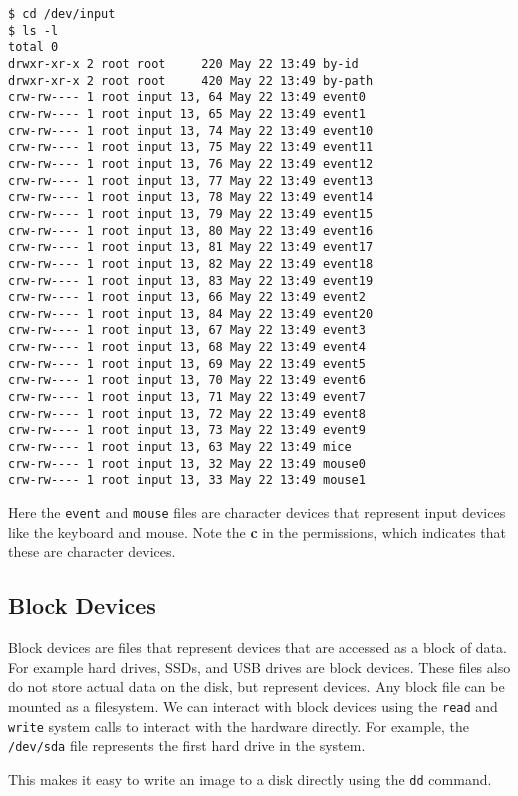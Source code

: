 \begin{lstlisting}
$ cd /dev/input
$ ls -l
total 0
drwxr-xr-x 2 root root     220 May 22 13:49 by-id
drwxr-xr-x 2 root root     420 May 22 13:49 by-path
crw-rw---- 1 root input 13, 64 May 22 13:49 event0
crw-rw---- 1 root input 13, 65 May 22 13:49 event1
crw-rw---- 1 root input 13, 74 May 22 13:49 event10
crw-rw---- 1 root input 13, 75 May 22 13:49 event11
crw-rw---- 1 root input 13, 76 May 22 13:49 event12
crw-rw---- 1 root input 13, 77 May 22 13:49 event13
crw-rw---- 1 root input 13, 78 May 22 13:49 event14
crw-rw---- 1 root input 13, 79 May 22 13:49 event15
crw-rw---- 1 root input 13, 80 May 22 13:49 event16
crw-rw---- 1 root input 13, 81 May 22 13:49 event17
crw-rw---- 1 root input 13, 82 May 22 13:49 event18
crw-rw---- 1 root input 13, 83 May 22 13:49 event19
crw-rw---- 1 root input 13, 66 May 22 13:49 event2
crw-rw---- 1 root input 13, 84 May 22 13:49 event20
crw-rw---- 1 root input 13, 67 May 22 13:49 event3
crw-rw---- 1 root input 13, 68 May 22 13:49 event4
crw-rw---- 1 root input 13, 69 May 22 13:49 event5
crw-rw---- 1 root input 13, 70 May 22 13:49 event6
crw-rw---- 1 root input 13, 71 May 22 13:49 event7
crw-rw---- 1 root input 13, 72 May 22 13:49 event8
crw-rw---- 1 root input 13, 73 May 22 13:49 event9
crw-rw---- 1 root input 13, 63 May 22 13:49 mice
crw-rw---- 1 root input 13, 32 May 22 13:49 mouse0
crw-rw---- 1 root input 13, 33 May 22 13:49 mouse1
\end{lstlisting}

Here the \lstinline|event| and \lstinline|mouse| files are character devices that represent input devices like the keyboard and mouse.
Note the \textbf{c} in the permissions, which indicates that these are character devices.

\subsection{Block Devices}

Block devices are files that represent devices that are accessed as a block of data.
For example hard drives, SSDs, and USB drives are block devices.
These files also do not store actual data on the disk, but represent devices.
Any block file can be mounted as a filesystem.
We can interact with block devices using the \lstinline|read| and \lstinline|write| system calls to interact with the hardware directly.
For example, the \lstinline|/dev/sda| file represents the first hard drive in the system.

This makes it easy to write an image to a disk directly using the \lstinline|dd| command.

